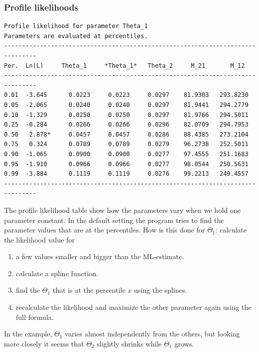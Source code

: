 \subsubsection{Profile likelihoods}
\begin{center}
\begin{boxedminipage}{6in}
\begin{small}
\begin{tt}
\begin{verbatim}
Profile likelihood for parameter Theta_1
Parameters are evaluated at percentiles.
-------------------------------------------------------------------------------
Per.  Ln(L)     Theta_1     *Theta_1*   Theta_2     M_21       M_12      
-------------------------------------------------------------------------------
0.01  -3.645      0.0223     0.0223     0.0297    81.9303   293.8230 
0.05  -2.065      0.0240     0.0240     0.0297    81.9441   294.2779 
0.10  -1.329      0.0250     0.0250     0.0297    81.9766   294.5011 
0.25  -0.284      0.0266     0.0266     0.0296    82.0709   294.7953 
0.50   2.878*     0.0457     0.0457     0.0286    88.4385   273.2104 
0.75   0.324      0.0789     0.0789     0.0279    96.2738   252.5011 
0.90  -1.065      0.0900     0.0900     0.0277    97.4555   251.1683 
0.95  -1.910      0.0966     0.0966     0.0277    98.0544   250.5631 
0.99  -3.884      0.1119     0.1119     0.0276    99.2213   249.4557 
-------------------------------------------------------------------------------
\end{verbatim}
\end{tt}
\end{small}
\end{boxedminipage}
\end{center}

The profile likelihood table show how the parameters vary
when we hold one parameter constant. In the default setting the program tries to
find the parameter values that are at the percentiles.
How is this done for $\Theta_1$:
 calculate the likelihood value for
\begin{enumerate}
  \item a few values smaller and bigger than the ML-estimate. 
  \item calculate a spline
function. 
\item find the $\Theta_1$ that is at the percentile $x$ using the
splines. 
\item recalculate the likelihood and maximize the other parameter again
using the full formula.
\end{enumerate} 
 In the example, $\Theta_1$ varies almost independently from the others, but looking more closely it seems that $\Theta_2$ slightly
shrinks while $\Theta_1$ grows.

